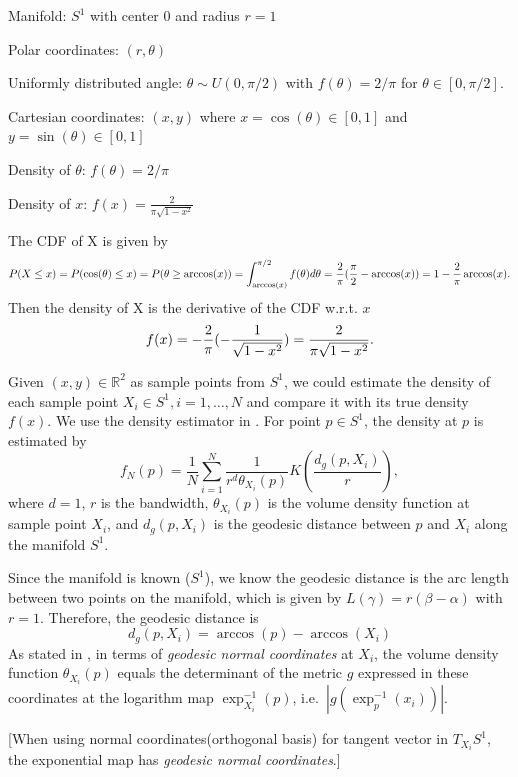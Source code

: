 \documentclass[11pt,a4paper,]{article}
\begin{document}
Manifold: \(S^1\) with center 0 and radius \(r=1\)

Polar coordinates: \((r, \theta)\)

Uniformly distributed angle: \(\theta \sim U(0, \pi/2)\) with \(f(\theta) = 2 / \pi\) for \(\theta \in [0, \pi /2]\).

Cartesian coordinates: \((x, y)\) where \(x = \cos(\theta) \in [0, 1]\) and \(y = \sin(\theta) \in [0, 1]\)

Density of \(\theta\): \(f(\theta) = 2 / \pi\)

Density of \(x\): \(f(x) = \frac{2}{\pi \sqrt{1-x^2}}\)

The CDF of X is given by
\[
P(X \leq x) = P(\cos(\theta) \leq x) \\
= P(\theta \geq \arccos(x)) \\
= \int_{\arccos(x)}^{\pi/2} f(\theta) d\theta \\
=  \frac{2}{\pi} (\frac{\pi}{2} - \arccos(x) ) \\
= 1 - \frac{2}{\pi} \arccos(x).
\]
Then the density of X is the derivative of the CDF w.r.t. \(x\) \[
f(x) = -\frac{2}{\pi} (-\frac{1}{\sqrt{1 - x^2}}) \\
= \frac{2}{\pi \sqrt{1 - x^2}}.
\]

Given \((x, y) \in \mathbb{R}^2\) as sample points from \(S^1\), we could
estimate the density of each sample point \(X_i \in S^1, i = 1, \dots, N\)
and compare it with its true density \(f(x)\).
We use the density estimator in \textcite{Pelletier2005-vu}. For point \(p \in S^1\), the density at \(p\) is estimated by
\[
f_N(p) = \frac{1}{N} \sum_{i=1}^{N} \frac{1}{r^d \theta_{X_i}(p)} K(\frac{d_g(p, X_i)}{r}),
\]
where \(d=1\), \(r\) is the bandwidth, \(\theta_{X_i}(p)\) is the volume density function at sample point \(X_i\), and \(d_g(p, X_i)\) is the geodesic distance between \(p\) and \(X_i\) along the manifold \(S^1\).

Since the manifold is known (\(S^1\)), we know the geodesic distance is the arc length between two points on the manifold, which is given by \(L(\gamma) = r(\beta - \alpha)\) with \(r=1\). Therefore, the geodesic distance is
\[
d_g(p, X_i) = \arccos(p) - \arccos(X_i)
\]
As stated in \textcite{Pelletier2005-vu}, in terms of \emph{geodesic normal coordinates} at \(X_i\), the volume density function \(\theta_{X_i}(p)\) equals the determinant of the metric \(g\) expressed in these coordinates at the logarithm map \(\exp_{X_i}^{-1}(p)\), i.e.~\(|g(\exp_p^{-1}(x_i))|\).

{[}When using normal coordinates(orthogonal basis) for tangent vector in \(T_{X_i}S^1\), the exponential map has \emph{geodesic normal coordinates}.{]}
\end{document}
